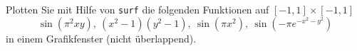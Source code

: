 \begin{aufg}[0]
Plotten Sie mit Hilfe von \lstinline!surf! die folgenden Funktionen auf
  $[-1,1]\times [-1,1]$
{
\[ \sin( \pi^2 xy), \ (x^2-1)(y^2-1), \ \sin(\pi x ^2), \ \sin(- \pi
  e^{-x^2-y^2}) \]}
in einem Grafikfenster (nicht überlappend). 
\end{aufg}